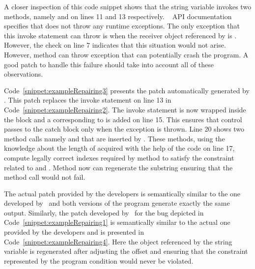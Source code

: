 A closer inspection of this code snippet shows that the string variable
 invokes two methods, namely  and 
on lines 11 and 13 respectively. \java\  API documentation
specifies that  does not throw any runtime exceptions. The only
exception that this invoke statement can throw is when the receiver object
referenced by  is . However, the check on line 7
indicates that this situation would not arise. However, method 
can throw  exception that can potentially crash
the program. A good patch to handle this failure should take into account all of
these observations. 

Code~\ref{snippet:exampleRepairing3} presents the patch automatically generated
by \tool . This patch replaces the invoke statement on line 13 in
Code~\ref{snippet:exampleRepairing2}. The invoke statement is now wrapped inside
the  block and a  corresponding to
 is added on line 15. This ensures that
control passes to the catch block only when the exception is thrown. Line 20
shows two method calls namely  and  that are
inserted by \tool. These methods, using the knowledge about the length of
 acquired with the help of the code on line 17, compute legally
correct indexes required by  method to satisfy the constraint
related to  and . Method  now
can regenerate the substring ensuring that the method call would not fail. 

The actual patch provided by the developers is semantically similar to the one
developed by \tool\ and both versions of the program generate exactly the same
output. Similarly, the patch developed by \tool\ for the bug depicted in
Code~\ref{snippet:exampleRepairing1} is semantically similar to the actual one
provided by the developers and is presented in
Code~\ref{snippet:exampleRepairing4}. Here the object referenced by the string
variable  is regenerated after adjusting the offset and ensuring that
the constraint represented by the program condition 
would never be violated.


